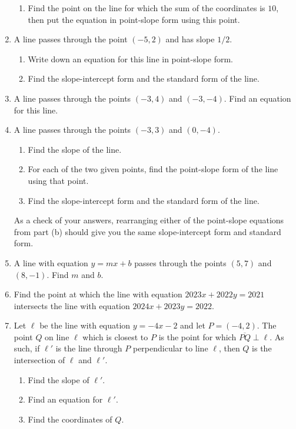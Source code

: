 \begin{enumerate}
\begin{enumerate}
\item Find the point on the line for which the sum of the coordinates is $10$, then put the equation in point-slope form using this point.
\end{enumerate}
\item A line passes through the point $(-5,2)$ and has slope $1/2$.
\begin{enumerate}
\item Write down an equation for this line in point-slope form.
\item Find the slope-intercept form and the standard form of the line.
\end{enumerate}
\item A line passes through the points $(-3,4)$ and $(-3,-4)$. Find an equation for this line.
\item A line passes through the points $(-3,3)$ and $(0,-4)$.
\begin{enumerate}
\item Find the slope of the line.
\item For each of the two given points, find the point-slope form of the line using that point.
\item Find the slope-intercept form and the standard form of the line.
\end{enumerate}
As a check of your answers, rearranging either of the point-slope equations from part (b) should give you the same slope-intercept form and standard form.
\item A line with equation $y = mx + b$ passes through the points $(5,7)$ and $(8,-1)$. Find $m$ and $b$.
\item Find the point at which the line with equation $2023x + 2022y = 2021$ intersects the line with equation $2024x + 2023y = 2022$.
\item Let $\ell$ be the line with equation $y = -4x - 2$ and let $P = (-4, 2)$. The point $Q$ on line $\ell$ which is closest to $P$ is the point for which $\overline{PQ}\perp\ell$. As such, if $\ell'$ is the line through $P$ perpendicular to line $\ell$, then $Q$ is the intersection of $\ell$ and $\ell'$.
\begin{enumerate}
\item Find the slope of $\ell'$.
\item Find an equation for $\ell'$.
\item Find the coordinates of $Q$.
\end{enumerate}
\end{enumerate}

